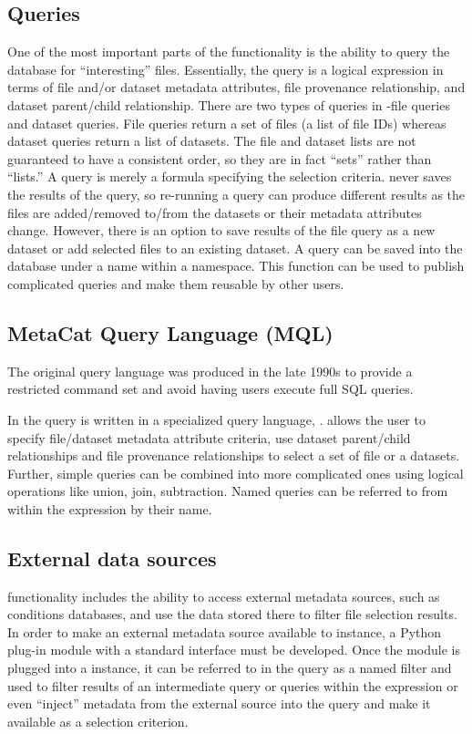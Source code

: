 \documentclass[../main-v1.tex]{subfiles}
\begin{document}
\subsection{Queries} 
One of the most important parts of the  functionality is the ability to query the database for ``interesting'' files. Essentially, the query is a logical expression in terms of file and/or dataset metadata attributes, file provenance relationship, and dataset parent/child relationship. There are two types of queries in -file queries and dataset queries. File queries return a set of files (a list of file IDs) whereas dataset queries return a list of datasets. The file and dataset lists are not guaranteed to have a consistent order, so they are in fact ``sets'' rather than ``lists.'' 
A query is merely a formula specifying the selection criteria.  never saves the results of the query, so re-running a query can produce different results as the files are %
added/removed to/from the datasets or their metadata attributes change. However, there is an option to save results of the file query as a new dataset or add selected files to an existing dataset. 
A query can be saved into the database under a name within a namespace. This function can be used to publish complicated queries and make them reusable by other users. 

\subsection{MetaCat Query Language (MQL)}
The original  query language was produced in the late 1990s to provide a restricted command set and  avoid having users execute full SQL queries.

In   the query is written in a specialized query language, .  allows the user to specify file/dataset metadata attribute criteria, use dataset parent/child relationships and file provenance relationships to select a set of file or a datasets. Further, simple queries can be combined into more complicated ones using logical operations like union, join, subtraction. Named queries can be referred to from within the  expression by their name. 

\subsection{External data sources }
   functionality includes the ability to access external metadata sources, such as conditions databases, and use the data stored there to filter file selection results. In order to make an external metadata source available to  instance,  a Python plug-in module with a standard interface must be developed.  Once the module is plugged into a  instance, it can be referred to in the  query as a named filter  and used to filter results of an intermediate query or queries within the  expression or even ``inject'' metadata from the external source into the query and make it available as a  selection criterion. 
\end{document}
